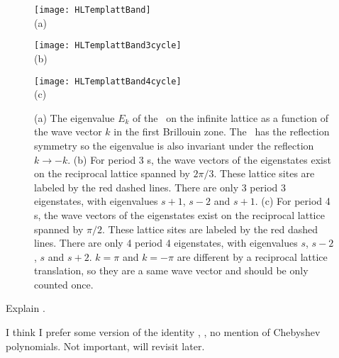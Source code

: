 \begin{figure}\begin{center}
            \begin{minipage}[c]{0.3\textwidth}\begin{center}
\texttt{[image: HLTemplattBand]}\\(a)
            \end{center}\end{minipage}
            \begin{minipage}[c]{0.3\textwidth}\begin{center}
\texttt{[image: HLTemplattBand3cycle]}\\(b)
            \end{center}\end{minipage}
            \begin{minipage}[c]{0.3\textwidth}\begin{center}
\texttt{[image: HLTemplattBand4cycle]}\\(c)
            \end{center}\end{minipage}
\end{center}
  \caption{\label{fig:LC21emplattBand}
(a) The eigenvalue $E_k$ of the \jacobianOrb\ on the infinite lattice as a function of the wave
vector $k$ in the first Brillouin zone. The \jacobianOrb\ has the reflection symmetry so the
eigenvalue is also invariant under the reflection $k\to -k$.
(b) For period 3 {\lattstate}s, the wave vectors of the eigenstates exist on the reciprocal lattice
spanned by $2\pi/3$. These lattice sites are labeled by the red dashed lines. There are only
3 period 3 eigenstates, with eigenvalues $s+1$, $s-2$ and $s+1$.
(c) For period 4 {\lattstate}s, the wave vectors of the eigenstates exist on the reciprocal lattice
spanned by $\pi/2$. These lattice sites are labeled by the red dashed lines. There are only
4 period 4 eigenstates, with eigenvalues $s$, $s-2$, $s$ and $s+2$.
$k=\pi$ and $k=-\pi$ are different by a reciprocal lattice translation, so they are a same
wave vector and should be only counted once.
          }
\end{figure}

Explain .

         {
I think I prefer some version of the identity ,
,
no mention of Chebyshev polynomials. Not important, will revisit later.
    }


